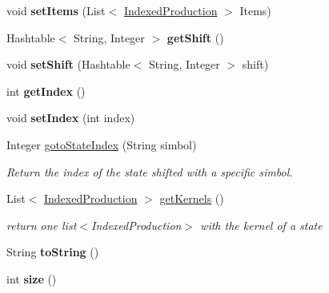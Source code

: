 \begin{DoxyCompactItemize}
\item 
\hypertarget{classcontext_free_1_1parser_1_1_state_ac5d2c09a67b8bba054456a652964735e}{void {\bfseries set\-Items} (List$<$ \hyperlink{classcontext_free_1_1parser_1_1_indexed_production}{Indexed\-Production} $>$ Items)}\label{classcontext_free_1_1parser_1_1_state_ac5d2c09a67b8bba054456a652964735e}

\item 
\hypertarget{classcontext_free_1_1parser_1_1_state_a0a46dd3cf055c0aa7951b4df93daf23e}{Hashtable$<$ String, Integer $>$ {\bfseries get\-Shift} ()}\label{classcontext_free_1_1parser_1_1_state_a0a46dd3cf055c0aa7951b4df93daf23e}

\item 
\hypertarget{classcontext_free_1_1parser_1_1_state_a391213320b8ca96be1ede02b449662c7}{void {\bfseries set\-Shift} (Hashtable$<$ String, Integer $>$ shift)}\label{classcontext_free_1_1parser_1_1_state_a391213320b8ca96be1ede02b449662c7}

\item 
\hypertarget{classcontext_free_1_1parser_1_1_state_a2548bf6b7febee3cf305edb33cac19ca}{int {\bfseries get\-Index} ()}\label{classcontext_free_1_1parser_1_1_state_a2548bf6b7febee3cf305edb33cac19ca}

\item 
\hypertarget{classcontext_free_1_1parser_1_1_state_a5ae06a15397a64125c28fd64f5985008}{void {\bfseries set\-Index} (int index)}\label{classcontext_free_1_1parser_1_1_state_a5ae06a15397a64125c28fd64f5985008}

\item 
Integer \hyperlink{classcontext_free_1_1parser_1_1_state_abaac15576397224a4495d8198cfe2f1d}{goto\-State\-Index} (String simbol)
\begin{DoxyCompactList}\small\item\em Return the index of the state shifted with a specific simbol. \end{DoxyCompactList}\item 
List$<$ \hyperlink{classcontext_free_1_1parser_1_1_indexed_production}{Indexed\-Production} $>$ \hyperlink{classcontext_free_1_1parser_1_1_state_a1afb2f9faa5ec548897e44cc863389ba}{get\-Kernels} ()
\begin{DoxyCompactList}\small\item\em return one list$<$\-Indexed\-Production$>$ with the kernel of a state \end{DoxyCompactList}\item 
\hypertarget{classcontext_free_1_1parser_1_1_state_aa480857783a31a4b8ab22f6a92b0f142}{String {\bfseries to\-String} ()}\label{classcontext_free_1_1parser_1_1_state_aa480857783a31a4b8ab22f6a92b0f142}

\item 
\hypertarget{classcontext_free_1_1parser_1_1_state_a6a9e16086ce29535a3e63caadb35a532}{int {\bfseries size} ()}\label{classcontext_free_1_1parser_1_1_state_a6a9e16086ce29535a3e63caadb35a532}

\end{DoxyCompactItemize}
